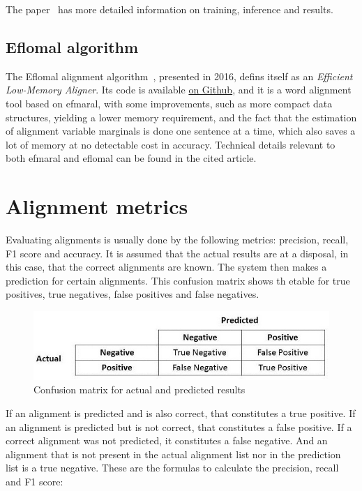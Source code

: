 The paper~\cite{dyer-etal-2013-simple} has more detailed information on training, inference and results.

\subsection{Eflomal algorithm}

The Eflomal alignment algorithm~\cite{ostling2016efficient}, presented in 2016, defins itself as an \emph{Efficient Low-Memory Aligner}. Its code is available \href{https://github.com/robertostling/eflomal}{on Github}, and it is a word alignment tool based on efmaral, with some improvements, such as more compact data structures, yielding a lower memory requirement, and the fact that the estimation of alignment variable marginals is done one sentence at a time, which also saves a lot of memory at no detectable cost in accuracy. Technical details relevant to both efmaral and eflomal can be found in the cited article.

\section{Alignment metrics}\label{tra:metrics}

Evaluating alignments is usually done by the following metrics: precision, recall, F1 score and accuracy. It is assumed that the actual results are at a disposal, in this case, that the correct alignments are known. The system then makes a prediction for certain alignments. This confusion matrix shows th etable for true positives, true negatives, false positives and false negatives.

\begin{figure}[!ht]
    \centering
    \includegraphics[width=12cm]{figures/precrec.jpeg}
    \caption{Confusion matrix for actual and predicted results}
\end{figure}

If an alignment is predicted and is also correct, that constitutes a true positive. If an alignment is predicted but is not correct, that constitutes a false positive. If a correct alignment was not predicted, it constitutes a false negative. And an alignment that is not present in the actual alignment list nor in the prediction list is a true negative. These are the formulas to calculate the precision, recall and F1 score:

